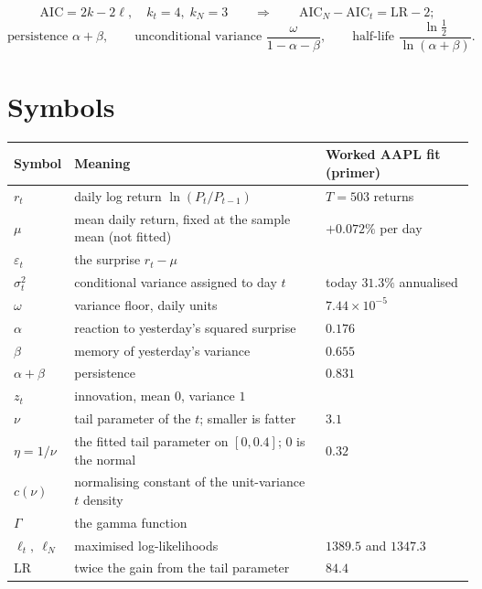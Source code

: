 \documentclass[11pt]{article}
\begin{document}
\begin{equation}
  \mathrm{AIC} = 2k - 2\ell, \quad k_t = 4,\; k_N = 3
  \qquad\Longrightarrow\qquad \mathrm{AIC}_N - \mathrm{AIC}_t = \mathrm{LR} - 2 ;
\end{equation}
\begin{equation}
  \text{persistence } \alpha+\beta, \qquad
  \text{unconditional variance } \frac{\omega}{1-\alpha-\beta}, \qquad
  \text{half-life } \frac{\ln\tfrac12}{\ln(\alpha+\beta)} .
\end{equation}

\section*{Symbols}

\begin{center}
\begin{tabular}{@{}lll@{}}
\toprule
Symbol & Meaning & Worked AAPL fit (primer) \\
\midrule
$r_t$ & daily log return $\ln(P_t/P_{t-1})$ & $T = 503$ returns \\
$\mu$ & mean daily return, fixed at the sample mean (not fitted) & $+0.072\%$ per day \\
$\varepsilon_t$ & the surprise $r_t - \mu$ & \\
$\sigma_t^2$ & conditional variance assigned to day $t$ & today $31.3\%$ annualised \\
$\omega$ & variance floor, daily units & $7.44\times10^{-5}$ \\
$\alpha$ & reaction to yesterday's squared surprise & $0.176$ \\
$\beta$ & memory of yesterday's variance & $0.655$ \\
$\alpha+\beta$ & persistence & $0.831$ \\
$z_t$ & innovation, mean $0$, variance $1$ & \\
$\nu$ & tail parameter of the $t$; smaller is fatter & $3.1$ \\
$\eta = 1/\nu$ & the fitted tail parameter on $[0, 0.4]$; $0$ is the normal & $0.32$ \\
$c(\nu)$ & normalising constant of the unit-variance $t$ density & \\
$\Gamma$ & the gamma function & \\
$\ell_t,\ \ell_N$ & maximised log-likelihoods & $1389.5$ and $1347.3$ \\
$\mathrm{LR}$ & twice the gain from the tail parameter & $84.4$ \\
\bottomrule
\end{tabular}
\end{center}
\end{document}
